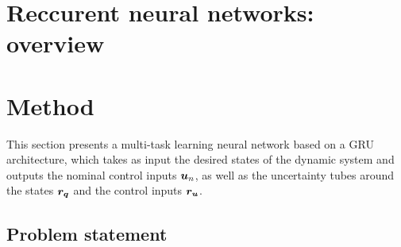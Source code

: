     
    
    
    
    

\section{Reccurent neural networks: overview}

\section{Method} \label{sec:method}

This section presents a multi-task learning neural network based on a GRU architecture, which takes as input the desired states of the dynamic system and outputs the nominal control inputs $\boldsymbol{u}_n$, as well as the uncertainty tubes around the states $\boldsymbol{r_q}$ and the control inputs $\boldsymbol{r_u}$. 

\subsection{Problem statement}

